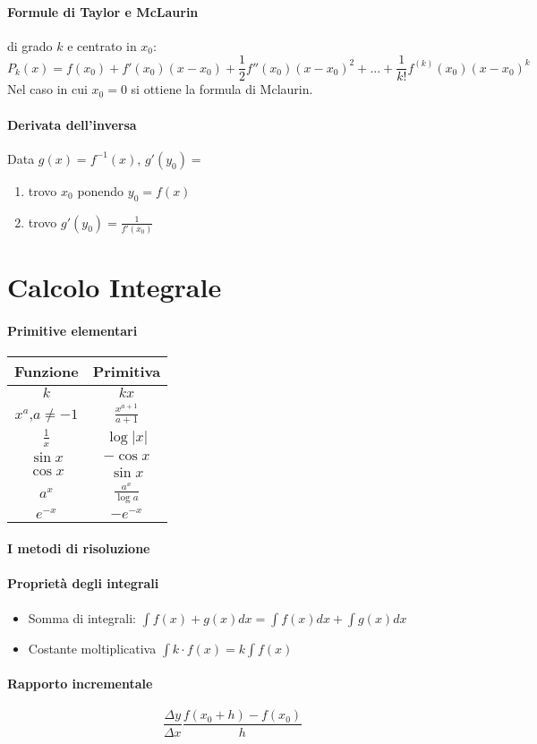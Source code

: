 \documentclass[12pt, a4paper, openany]{book}
\begin{document}
	\paragraph*{Formule di Taylor e McLaurin} di grado $k$ e centrato in $x_0$:
	$$P_k(x)=f(x_0)+f'(x_0)(x-x_0) + \frac{1}{2}f''(x_0)(x-x_0)^2 +... + \frac{1}{k!}f^{(k)}(x_0)(x-x_0)^k$$
	Nel caso in cui $x_0=0$ si ottiene la formula di Mclaurin.
	\paragraph*{Derivata dell'inversa} Data $g(x) = f^{-1}(x)$, $g'(y_0)=$
\begin{enumerate}
	\item trovo $x_0$ ponendo $y_0=f(x)$
	\item trovo $g'(y_0)=\frac{1}{f'(x_0)}$
\end{enumerate}


\section*{Calcolo Integrale}
\paragraph*{Primitive elementari}
\begin{tabular}{ |c|c| }
	\hline
	Funzione        & Primitiva             \\
	\hline
	$k$             & $kx$                  \\
	$x^a$,$a\neq-1$ & $\frac{x^{a+1}}{a+1}$ \\
	$\frac{1}{x}$   & $\log|x|$             \\
	$\sin x$        & $-\cos x$             \\
	$\cos x $       & $\sin x$              \\
	$a^x$           & $\frac{a^x}{\log a}$  \\
	\hline
	$e^{-x}$        & $-e^{-x}$             \\
\end{tabular}
\paragraph*{I metodi di risoluzione}
\paragraph*{Proprietà degli integrali}
\begin{itemize}
	\item Somma di integrali: $\int f(x)+g(x) dx = \int f(x) dx + \int g(x) dx$
	\item Costante moltiplicativa $\int k \cdot f(x) = k \int f(x)$
\end{itemize}

\paragraph*{Rapporto incrementale}
$$\frac{\Delta y}{ \Delta x}\frac{f(x_0+h)-f(x_0)}{h} $$
\end{document}
